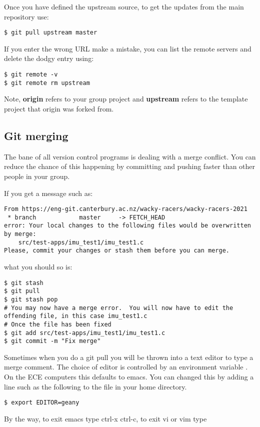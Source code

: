 Once you have defined the upstream source, to get the updates from the
main repository use:
%
\begin{verbatim}
$ git pull upstream master
\end{verbatim}

If you enter the wrong URL make a mistake, you can list the remote
servers and delete the dodgy entry using:

\begin{verbatim}
$ git remote -v
$ git remote rm upstream
\end{verbatim}

Note, \textbf{origin} refers to your group project and \textbf{upstream}
refers to the template project that origin was forked from.

\subsection{Git merging}
\label{git-merging}

The bane of all version control programs is dealing with a merge
conflict. You can reduce the chance of this happening by committing and
pushing faster than other people in your group.

If you get a message such as:

\begin{verbatim}
From https://eng-git.canterbury.ac.nz/wacky-racers/wacky-racers-2021
 * branch            master     -> FETCH_HEAD
error: Your local changes to the following files would be overwritten by merge:
    src/test-apps/imu_test1/imu_test1.c
Please, commit your changes or stash them before you can merge.
\end{verbatim}

what you should so is:

\begin{verbatim}
$ git stash
$ git pull
$ git stash pop
# You may now have a merge error.  You will now have to edit the offending file, in this case imu_test1.c
# Once the file has been fixed
$ git add src/test-apps/imu_test1/imu_test1.c
$ git commit -m "Fix merge"
\end{verbatim}

Sometimes when you do a git pull you will be thrown into a text editor
to type a merge comment. The choice of editor is controlled by an
environment variable . On the ECE computers this defaults
to emacs. You can changed this by adding a line such as the following to
the  file in your home directory.

\begin{verbatim}
$ export EDITOR=geany
\end{verbatim}

By the way, to exit emacs type ctrl-x ctrl-c, to exit vi or vim type 

